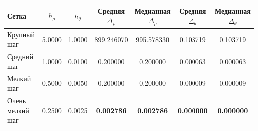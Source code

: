 \begin{tabular}{|l|c|c|c|c|c|c|}
\hline
Сетка & $h_\rho$ & $h_\theta$ & Средняя $\Delta_\rho$ & Медианная $\Delta_\rho$ & Средняя $\Delta_\theta$ & Медианная $\Delta_\theta$ \\
\hline
Крупный шаг & 5.0000 & 1.0000 & 899.246070 & 995.578330 & 0.103719 & 0.103719 \\
\hline
Средний шаг & 1.0000 & 0.0100 & 0.200000 & 0.200000 & 0.000063 & 0.000063 \\
\hline
Мелкий шаг & 0.5000 & 0.0050 & 0.200000 & 0.200000 & 0.000009 & 0.000009 \\
\hline
Очень мелкий шаг & 0.2500 & 0.0025 & \textbf{0.002786} & \textbf{0.002786} & \textbf{0.000000} & \textbf{0.000000} \\
\hline
\end{tabular}
